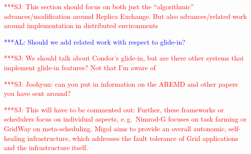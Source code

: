 \documentclass{rspublic}
\newcommand{\alnote}[1]{ {\textcolor{blue} { ***AL: #1 }}}
\newcommand{\jhanote}[1]{ {\textcolor{red} { ***SJ: #1 }}}
\newcommand{\alnote}[1]{}
\newcommand{\jhanote}[1]{}
\begin{document}
\jhanote{This section should focus on both just the ``algorithmic''
  advances/modification around Replica Exchange. But also
  advances/related work around  implementation in distributed
  environments}
                       
\alnote{Should we add related work with respect to glide-in?}

\jhanote{We should talk about Condor's glide-in, but are there other
  systems that implement glide-in features? Not that I'm aware of}

\jhanote{Joohyun: can you put in information on the AREMD and other
  papers you have sent around?}


                                 
\jhanote{This will have to be commented out: Further, these frameworks
  or schedulers focus on individual aspects, e.\,g.\ Nimrod-G focuses
  on task farming or GridWay on meta-scheduling. Migol aims to provide
  an overall autonomic, self-healing infrastructure, which addresses
  the fault tolerance of Grid applications and the infrastructure
  itself.}

\end{document}
